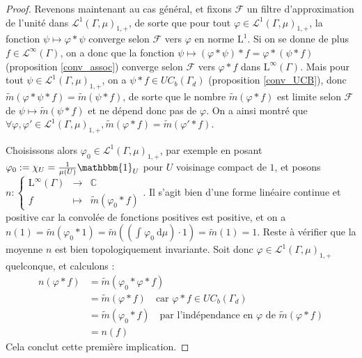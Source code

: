 \documentclass[a4paper,12pt]{article}
\newcommand{\C}{\mathbb{C}}
\newcommand{\indic}{\mathbbm{1}}
\newcommand{\integral}[4]{\int_{#1}^{#2} #3~\mathrm{d}#4}
\newcommand\fundef[3]{#1: \left\{\begin{array}{ccc}#2\\#3\end{array}\right.}
\begin{document}
\begin{proof}
    Revenons maintenant au cas général, et fixons $\mathscr{F}$ un filtre d'approximation de l'unité 
    dans $\mathscr{L}^1(\Gamma, \mu)_{1, +}$, de sorte que pour tout $\varphi\in\mathscr{L}^1(\Gamma, \mu)_{1, +}$, la fonction 
    $\psi\mapsto\varphi\ast\psi$ converge selon $\mathscr{F}$ vers $\varphi$ en norme $\mathrm{L}^1$. 
    Si on se donne de plus $f\in\mathscr{L}^\infty(\Gamma)$, on a donc que la fonction $\psi\mapsto(\varphi\ast\psi)\ast f = \varphi\ast(\psi\ast f)$
    (proposition \ref{conv_assoc}) converge selon $\mathscr{F}$ vers $\varphi\ast f$ dans $\mathrm{L}^\infty(\Gamma)$. Mais pour tout $\psi\in\mathscr{L}^1(\Gamma, \mu)_{1, +}$, on
    a $\psi\ast f\in UC_b(\Gamma_d)$ (proposition \ref{conv_UCB}), donc $\widetilde{m}(\varphi\ast\psi\ast f) = \widetilde{m}(\psi\ast f)$,
    de sorte que le nombre $\widetilde{m}(\varphi\ast f)$ est limite selon $\mathscr{F}$ de $\psi\mapsto\widetilde{m}(\psi\ast f)$ et 
    ne dépend donc pas de $\varphi$. On a ainsi montré que $\forall\varphi, \varphi'\in\mathscr{L}^1(\Gamma, \mu)_{1, +}, \widetilde{m}(\varphi\ast f) = \widetilde{m}(\varphi'\ast f)$.

    Choisissons alors $\varphi_0\in\mathscr{L}^1(\Gamma, \mu)_{1, +}$, par exemple en posant $\varphi_0:=\chi_U=\frac{1}{\mu(U)}\indic_U$ pour 
    $U$ voisinage compact de $1$, et posons $\fundef{n}{\mathrm{L}^\infty(\Gamma)&\to&\C}{f&\mapsto&\widetilde{m}(\varphi_0\ast f)}$. Il s'agit bien d'une 
    forme linéaire continue et positive car la convolée de fonctions positives est positive, et on a $n(1)=\widetilde{m}(\varphi_0\ast 1) = \widetilde{m}\left(\left(\integral{}{}{\varphi_0}{\mu}\right)\cdot 1\right) = \widetilde{m}(1) = 1$.
    Reste à vérifier que la moyenne $n$ est bien topologiquement invariante. Soit donc $\varphi\in\mathscr{L}^1(\Gamma, \mu)_{1, +}$ quelconque, et calculons :
    \begin{align*}
        n(\varphi\ast f) 
            &= \widetilde{m}(\varphi_0\ast\varphi\ast f) \\
            &= \widetilde{m}(\varphi\ast f) \quad\text{car } \varphi\ast f\in UC_b(\Gamma_d)\\
            &= \widetilde{m}(\varphi_0\ast f) \quad\text{par l'indépendance en $\varphi$ de $\widetilde{m}(\varphi\ast f)$} \\
            &= n(f)
    \end{align*}
    Cela conclut cette première implication. 


\end{proof}
\end{document}
